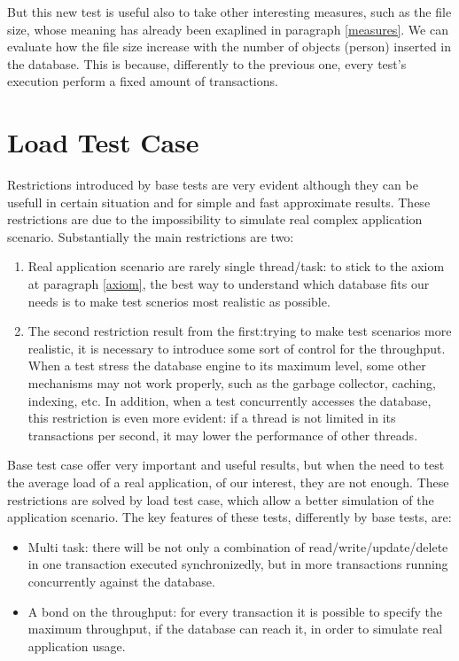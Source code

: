 But this new test is useful also to take other interesting measures, such as the file size, whose meaning has already been exaplined in paragraph \ref{measures}. We can evaluate how the file size increase with the number of objects (person) inserted in the database. This is because, differently to the previous one, every test's execution perform a fixed amount of transactions. 

	\section{Load Test Case}
Restrictions introduced by base tests are very evident although they can be usefull in certain situation and for simple and fast approximate results. These restrictions are due to the impossibility to simulate real complex application scenario. Substantially the main restrictions are two:
\begin{enumerate}
	\item Real application scenario are rarely single thread/task: to stick to the axiom at paragraph \ref{axiom}, the best way to understand which database fits our needs is to make test scnerios most realistic as possible.
	\item The second restriction result from the first:trying to make test scenarios more realistic, it is necessary to introduce some sort of control for the throughput. When a test stress the database engine to its maximum level, some other mechanisms may not work properly, such as the garbage collector, caching, indexing, etc. In addition, when a test concurrently accesses the database, this restriction is even more evident: if a thread is not limited in its transactions per second, it may lower the performance of other threads.
\end{enumerate}

Base test case offer very important and useful results, but when the need to test the average load of a real application, of our interest, they are not enough. These restrictions are solved by load test case, which allow a better simulation of the application scenario. The key features of these tests, differently by base tests, are:
\begin{itemize}
	\item Multi task: there will be not only a combination of read/write/update/delete in one transaction executed synchronizedly, but in more transactions running concurrently against the database.
	\item A bond on the throughput: for every transaction it is possible to specify the maximum throughput, if the database can reach it, in order to simulate real application usage.
\end{itemize}

